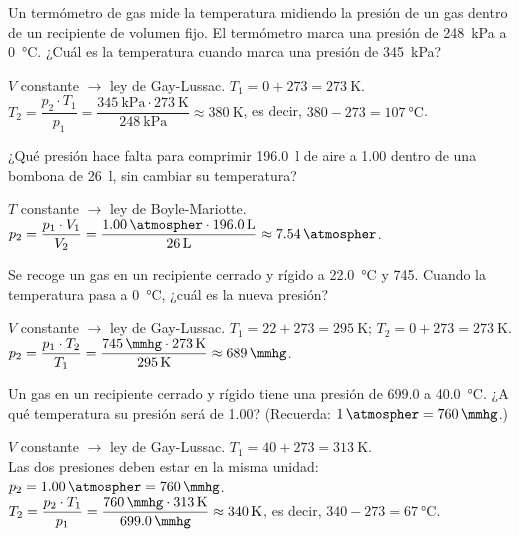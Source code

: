 \begin{exercise}
    Un termómetro de gas mide la temperatura midiendo la presión de un gas dentro de un recipiente de volumen fijo. El termómetro marca una presión de \qty{248}{\kilo\pascal} a \qty{0}{\celsius}. ¿Cuál es la temperatura cuando marca una presión de \qty{345}{\kilo\pascal}?
    \begin{solu}
        \(V\) constante \(\to\) ley de Gay-Lussac. \(T_1 = 0 + 273 = \qty{273}{\kelvin}\). \\
        \(T_2 = \dfrac{p_2 \cdot T_1}{p_1} = \dfrac{\qty{345}{\kilo\pascal} \cdot \qty{273}{\kelvin}}{\qty{248}{\kilo\pascal}} \approx \qty{380}{\kelvin}\), es decir, \(380 - 273 = \qty{107}{\celsius}\).
    \end{solu}
\end{exercise}

\begin{exercise}
    ¿Qué presión hace falta para comprimir \qty{196.0}{\litre} de aire a \qty{1.00}{\atmospher} dentro de una bombona de \qty{26}{\litre}, sin cambiar su temperatura?
    \begin{solu}
        \(T\) constante \(\to\) ley de Boyle-Mariotte. \\
        \(p_2 = \dfrac{p_1 \cdot V_1}{V_2} = \dfrac{\qty{1.00}{\atmospher} \cdot \qty{196.0}{\litre}}{\qty{26}{\litre}} \approx \qty{7.54}{\atmospher}\).
    \end{solu}
\end{exercise}

\begin{exercise}
    Se recoge un gas en un recipiente cerrado y rígido a \qty{22.0}{\celsius} y \qty{745}{\mmhg}. Cuando la temperatura pasa a \qty{0}{\celsius}, ¿cuál es la nueva presión?
    \begin{solu}
        \(V\) constante \(\to\) ley de Gay-Lussac. \(T_1 = 22 + 273 = \qty{295}{\kelvin}\); \(T_2 = 0 + 273 = \qty{273}{\kelvin}\). \\
        \(p_2 = \dfrac{p_1 \cdot T_2}{T_1} = \dfrac{\qty{745}{\mmhg} \cdot \qty{273}{\kelvin}}{\qty{295}{\kelvin}} \approx \qty{689}{\mmhg}\).
    \end{solu}
\end{exercise}

\begin{exercise}
    Un gas en un recipiente cerrado y rígido tiene una presión de \qty{699.0}{\mmhg} a \qty{40.0}{\celsius}. ¿A qué temperatura su presión será de \qty{1.00}{\atmospher}? (Recuerda: \(\qty{1}{\atmospher} = \qty{760}{\mmhg}\).)
    \begin{solu}
        \(V\) constante \(\to\) ley de Gay-Lussac. \(T_1 = 40 + 273 = \qty{313}{\kelvin}\). \\
        Las dos presiones deben estar en la misma unidad: \(p_2 = \qty{1.00}{\atmospher} = \qty{760}{\mmhg}\). \\
        \(T_2 = \dfrac{p_2 \cdot T_1}{p_1} = \dfrac{\qty{760}{\mmhg} \cdot \qty{313}{\kelvin}}{\qty{699.0}{\mmhg}} \approx \qty{340}{\kelvin}\), es decir, \(340 - 273 = \qty{67}{\celsius}\).
    \end{solu}
\end{exercise}

